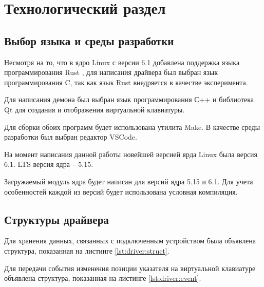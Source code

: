 \section{Технологический раздел}

\subsection{Выбор языка и среды разработки}

Несмотря на то, что в ядро Linux с версии 6.1 добавлена поддержка языка программирования Rust \cite{Rust}, для написания драйвера был выбран язык программирования C, так как язык Rust внедряется в качестве эксперимента.

Для написания демона был выбран язык программирования С++ и библиотека Qt для создания и отображения виртуальной клавиатуры.

Для сборки обоих программ будет использована утилита Make. В качестве среды разработки был выбран редактор VSCode.

На момент написания данной работы новейшей версией ярда Linux была версия 6.1. LTS версия ядра -- 5.15.

Загружаемый модуль ядра будет написан для версий ядра 5.15 и 6.1. Для учета особенностей каждой из версий будет использована условная компиляция.

\subsection{Структуры драйвера}

Для хранения данных, связанных с подключенным устройством была объявлена структура, показанная на листинге \ref{lst:driver:struct}.


Для передачи события изменения позиции указателя на виртуальной клавиатуре объявлена структура, показанная на листинге \ref{lst:driver:event}.


